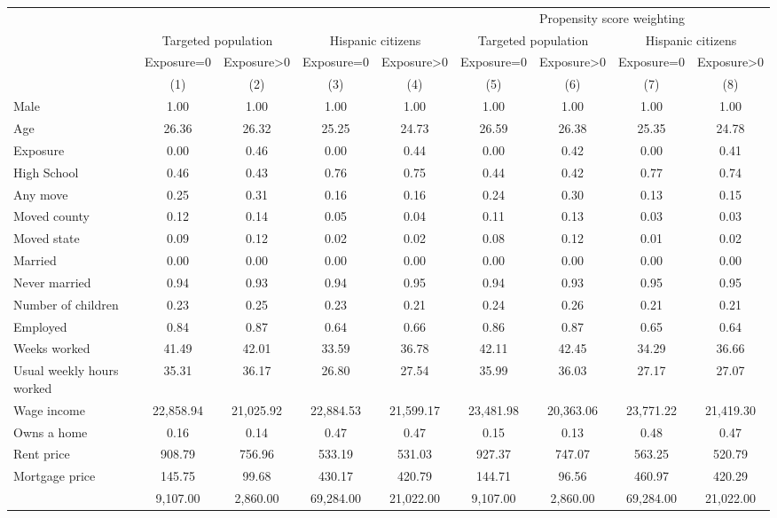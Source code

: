 \begin{tabular}{lcccccccc}
\toprule
\toprule
 & & & & & \multicolumn{4}{c}{Propensity score weighting} \\
 & \multicolumn{2}{c}{Targeted population} & \multicolumn{2}{c}{Hispanic citizens} & \multicolumn{2}{c}{Targeted population} & \multicolumn{2}{c}{Hispanic citizens}  \\
 & Exposure=0 & Exposure>0 & Exposure=0 & Exposure>0 & Exposure=0 & Exposure>0 & Exposure=0 & Exposure>0 \\
 & (1) & (2) & (3) & (4) & (5) & (6) & (7) & (8) \\
\midrule 
 Male  & 1.00 & 1.00 & 1.00 & 1.00 & 1.00 & 1.00 & 1.00 & 1.00\\
 Age  & 26.36 & 26.32 & 25.25 & 24.73 & 26.59 & 26.38 & 25.35 & 24.78\\
 Exposure  & 0.00 & 0.46 & 0.00 & 0.44 & 0.00 & 0.42 & 0.00 & 0.41\\
 High School  & 0.46 & 0.43 & 0.76 & 0.75 & 0.44 & 0.42 & 0.77 & 0.74\\
 Any move  & 0.25 & 0.31 & 0.16 & 0.16 & 0.24 & 0.30 & 0.13 & 0.15\\
 Moved county  & 0.12 & 0.14 & 0.05 & 0.04 & 0.11 & 0.13 & 0.03 & 0.03\\
 Moved state  & 0.09 & 0.12 & 0.02 & 0.02 & 0.08 & 0.12 & 0.01 & 0.02\\
 Married  & 0.00 & 0.00 & 0.00 & 0.00 & 0.00 & 0.00 & 0.00 & 0.00\\
 Never married  & 0.94 & 0.93 & 0.94 & 0.95 & 0.94 & 0.93 & 0.95 & 0.95\\
 Number of children  & 0.23 & 0.25 & 0.23 & 0.21 & 0.24 & 0.26 & 0.21 & 0.21\\
 Employed  & 0.84 & 0.87 & 0.64 & 0.66 & 0.86 & 0.87 & 0.65 & 0.64\\
 Weeks worked  & 41.49 & 42.01 & 33.59 & 36.78 & 42.11 & 42.45 & 34.29 & 36.66\\
 Usual weekly hours worked  & 35.31 & 36.17 & 26.80 & 27.54 & 35.99 & 36.03 & 27.17 & 27.07\\
 Wage income  & 22,858.94 & 21,025.92 & 22,884.53 & 21,599.17 & 23,481.98 & 20,363.06 & 23,771.22 & 21,419.30\\
 Owns a home  & 0.16 & 0.14 & 0.47 & 0.47 & 0.15 & 0.13 & 0.48 & 0.47\\
 Rent price  & 908.79 & 756.96 & 533.19 & 531.03 & 927.37 & 747.07 & 563.25 & 520.79\\
 Mortgage price  & 145.75 & 99.68 & 430.17 & 420.79 & 144.71 & 96.56 & 460.97 & 420.29\\
   & 9,107.00 & 2,860.00 & 69,284.00 & 21,022.00 & 9,107.00 & 2,860.00 & 69,284.00 & 21,022.00\\
\bottomrule
\bottomrule
\end{tabular}